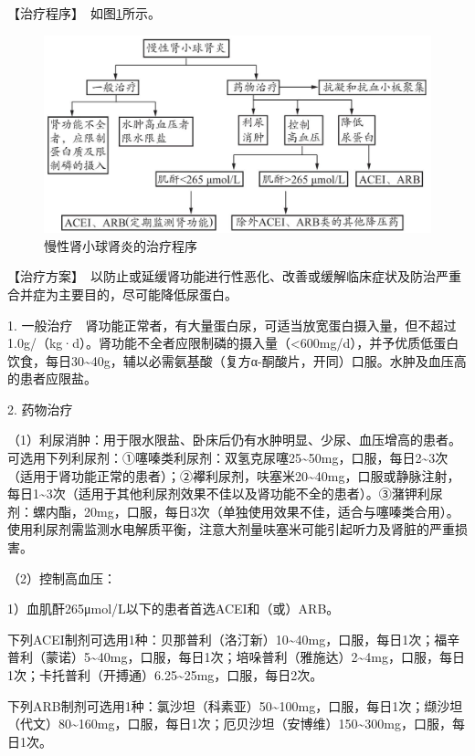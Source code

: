 【治疗程序】　如图\ref{fig4-1-3}所示。

\begin{figure}[!htbp]
 \centering
 \includegraphics{./images/Image00122.jpg}
 \captionsetup{justification=centering}
 \caption{慢性肾小球肾炎的治疗程序}
 \label{fig4-1-3}
  \end{figure} 

【治疗方案】　以防止或延缓肾功能进行性恶化、改善或缓解临床症状及防治严重合并症为主要目的，尽可能降低尿蛋白。

1.
一般治疗　肾功能正常者，有大量蛋白尿，可适当放宽蛋白摄入量，但不超过1.0g/（kg·d）。肾功能不全者应限制磷的摄入量（\textless{}600mg/d），并予优质低蛋白饮食，每日30\textasciitilde{}40g，辅以必需氨基酸（复方α-酮酸片，开同）口服。水肿及血压高的患者应限盐。

2. 药物治疗

（1）利尿消肿：用于限水限盐、卧床后仍有水肿明显、少尿、血压增高的患者。可选用下列利尿剂：①噻嗪类利尿剂：双氢克尿噻25\textasciitilde{}50mg，口服，每日2\textasciitilde{}3次（适用于肾功能正常的患者）；②襻利尿剂，呋塞米20\textasciitilde{}40mg，口服或静脉注射，每日1\textasciitilde{}3次（适用于其他利尿剂效果不佳以及肾功能不全的患者）。③潴钾利尿剂：螺内酯，20mg，口服，每日3次（单独使用效果不佳，适合与噻嗪类合用）。使用利尿剂需监测水电解质平衡，注意大剂量呋塞米可能引起听力及肾脏的严重损害。

（2）控制高血压：

1）血肌酐265μmol/L以下的患者首选ACEI和（或）ARB。

下列ACEI制剂可选用1种：贝那普利（洛汀新）10\textasciitilde{}40mg，口服，每日1次；福辛普利（蒙诺）5\textasciitilde{}40mg，口服，每日1次；培哚普利（雅施达）2\textasciitilde{}4mg，口服，每日1次；卡托普利（开搏通）6.25\textasciitilde{}25mg，口服，每日2次。

下列ARB制剂可选用1种：氯沙坦（科素亚）50\textasciitilde{}100mg，口服，每日1次；缬沙坦（代文）80\textasciitilde{}160mg，口服，每日1次；厄贝沙坦（安博维）150\textasciitilde{}300mg，口服，每日1次。

